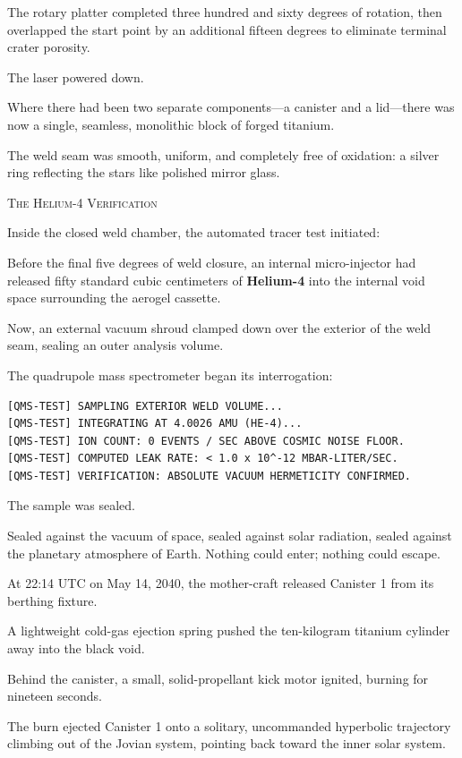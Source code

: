 \documentclass[12pt,twoside,openright]{book}
\newcommand{\sceneheader}[1]{%
  \par\vspace{1.8em}%
  {\noindent\centering\scshape\large #1\par}%
  \vspace{1.0em}%
  \noindent%
}
\newcommand{\dinkus}{%
  \par\vspace{1.2em}%
  {\noindent\centering{\large $\ast\quad\ast\quad\ast$}\par}%
  \vspace{1.2em}%
  \noindent%
}
\begin{document}
The rotary platter completed three hundred and sixty degrees of
rotation, then overlapped the start point by an additional fifteen
degrees to eliminate terminal crater porosity.

The laser powered down.

Where there had been two separate components---a canister and a
lid---there was now a single, seamless, monolithic block of forged
titanium.

The weld seam was smooth, uniform, and completely free of oxidation: a
silver ring reflecting the stars like polished mirror glass.

\dinkus

\sceneheader{The Helium-4
Verification}

Inside the closed weld chamber, the automated tracer test initiated:

Before the final five degrees of weld closure, an internal
micro-injector had released fifty standard cubic centimeters of
\textbf{Helium-4} into the internal void space surrounding the aerogel
cassette.

Now, an external vacuum shroud clamped down over the exterior of the
weld seam, sealing an outer analysis volume.

The quadrupole mass spectrometer began its interrogation:

\begin{lstlisting}
[QMS-TEST] SAMPLING EXTERIOR WELD VOLUME...
[QMS-TEST] INTEGRATING AT 4.0026 AMU (HE-4)...
[QMS-TEST] ION COUNT: 0 EVENTS / SEC ABOVE COSMIC NOISE FLOOR.
[QMS-TEST] COMPUTED LEAK RATE: < 1.0 x 10^-12 MBAR-LITER/SEC.
[QMS-TEST] VERIFICATION: ABSOLUTE VACUUM HERMETICITY CONFIRMED.
\end{lstlisting}

The sample was sealed.

Sealed against the vacuum of space, sealed against solar radiation,
sealed against the planetary atmosphere of Earth. Nothing could enter;
nothing could escape.

At 22:14 UTC on May 14, 2040, the mother-craft released Canister 1 from
its berthing fixture.

A lightweight cold-gas ejection spring pushed the ten-kilogram titanium
cylinder away into the black void.

Behind the canister, a small, solid-propellant kick motor ignited,
burning for nineteen seconds.

The burn ejected Canister 1 onto a solitary, uncommanded hyperbolic
trajectory climbing out of the Jovian system, pointing back toward the
inner solar system.
\end{document}
